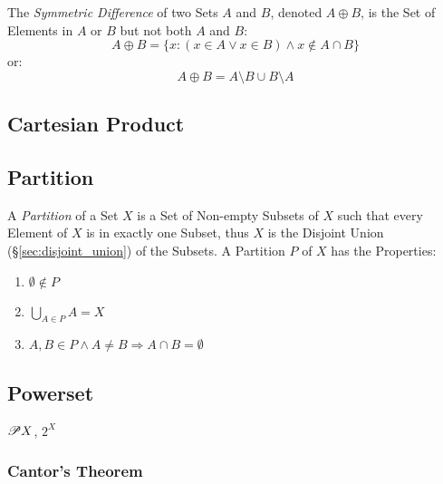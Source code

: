 The \emph{Symmetric Difference} of two Sets $A$ and $B$, denoted $A
\oplus B$, is the Set of Elements in $A$ or $B$ but not both $A$ and
$B$:
\[
  A \oplus B =
  \{ x : (x \in A \vee x \in B) \wedge x \notin A \cap B \}
\]
or:
\[
  A \oplus B = A \setminus B \cup B \setminus A
\]



\subsection{Cartesian Product}\label{sec:cartesian_product}

\subsection{Partition}\label{sec:set_partition}

A \emph{Partition} of a Set $X$ is a Set of Non-empty Subsets of $X$
such that every Element of $X$ is in exactly one Subset, thus $X$ is
the Disjoint Union (\S\ref{sec:disjoint_union}) of the Subsets. A
Partition $P$ of $X$ has the Properties:
\begin{enumerate}
  \item $\emptyset \notin P$
  \item $\bigcup_{A \in P}A = X$
  \item $A,B \in P \wedge A \neq B \Rightarrow A \cap B = \emptyset$
\end{enumerate}



\subsection{Powerset}\label{sec:powerset}

$\mathscr{P}{X}$, $2^X$

\subsubsection{Cantor's Theorem}\label{sec:cantors_theorem}



